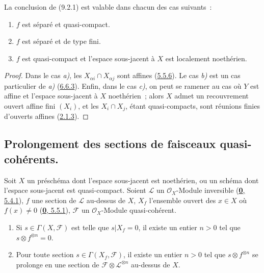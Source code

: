 \begin{corollary}[9.2.2]
\label{I.9.2.2-fr}
La conclusion de \textup{(9.2.1)} est valable dans chacun des cas suivants~:
\begin{enumerate}
\item[\textup{a)}] $f$ est séparé et quasi-compact.
\item[\textup{b)}] $f$ est séparé et de type fini.
\item[\textup{c)}] $f$ est quasi-compact et l'espace sous-jacent à $X$ est localement
noethérien.
\end{enumerate}
\end{corollary}

\begin{proof}
Dans le cas \emph{a)}, les $X_{\alpha i}\cap X_{\alpha j}$ sont affines
(\hyperref[I.5.5.6-fr]{5.5.6}). Le cas \emph{b)} est un cas particulier de \emph{a)}
(\hyperref[I.6.6.3-fr]{6.6.3}). Enfin, dans le cas \emph{c)}, on peut se ramener au
cas où $Y$ est affine et l'espace sous-jacent à $X$ noethérien~; alors $X$
admet un recouvrement ouvert affine fini $(X_i)$, et les $X_i\cap X_j$, étant
quasi-compacts, sont réunions finies d'ouverts affines
(\hyperref[I.2.1.3-fr]{2.1.3}).
\end{proof}

\subsection{Prolongement des sections de faisceaux quasi-cohérents.}
\label{subsection:I.9.3-fr}

\begin{theorem}[9.3.1]
\label{I.9.3.1-fr}
Soit $X$ un préschéma dont l'espace sous-jacent est noethérien, ou un schéma
dont l'espace sous-jacent est quasi-compact. Soient $\mathscr{L}$ un
$\mathscr{O}_X$-Module inversible
\textup{(\hyperref[0.5.4.1-fr]{\textbf{0}, 5.4.1})}, $f$ une section de $\mathscr{L}$ au-dessus
de $X$, $X_f$ l'ensemble ouvert des $x\in X$ où $f(x)\neq0$
\textup{(\hyperref[0.5.5.1-fr]{\textbf{0}, 5.5.1})}, $\mathscr{F}$ un
$\mathscr{O}_X$-Module quasi-cohérent.
\begin{enumerate}
\item[\textup{(i)}] Si $s\in\Gamma(X,\mathscr{F})$ est telle que $s|X_f=0$, il existe
un entier $n>0$ tel que $s\otimes f^{\otimes n}=0$.
\item[\textup{(ii)}] Pour toute section $s\in\Gamma(X_f,\mathscr{F})$, il existe un
entier $n>0$ tel que $s\otimes f^{\otimes n}$ se prolonge en une section de
$\mathscr{F}\otimes\mathscr{L}^{\otimes n}$ au-dessus de $X$.
\end{enumerate}
\end{theorem}

